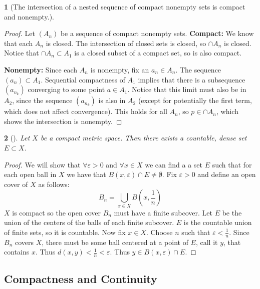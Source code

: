\documentclass[11pt]{article}
\numberwithin{equation}{section}
\theoremstyle{plain}
\newtheorem{theorem}{\color{ForestGreen}{\textbf{Theorem}}}[section]
\theoremstyle{definition}
\def\ss{\subset}
\newcommand{\1}{\mathbbm 1}
\newcommand{\e}{\varepsilon}
\begin{document}
\begin{theorem}[The intersection of a nested sequence of compact nonempty sets is compact and nonempty.]
\end{theorem}
\begin{proof}
	Let $(A_n)$ be a sequence of compact nonempty sets. 
	\textbf{Compact:} We know that each $A_n$ is closed. The intersection of closed sets is closed, so $\cap A_n$ is closed. Notice that $\cap A_n \ss A_1$ is a closed subset of a compact set, so is also compact. 

	\textbf{Nonempty:} Since each $A_n$ is nonempty, fix an $a_n \in A_n$. The sequence $(a_n) \ss A_1$. Sequential compactness of $A_1$ implies that there is a subsequence $(a_{n_k})$ converging to some point $a \in A_1$. Notice that this limit must also be in $A_2$, since the sequence $(a_{n_k})$ is also in $A_2$ (except for potentially the first term, which does not affect convergence). This holds for all $A_n$, so $p \in \cap A_n$, which shows the intersection is nonempty.   
\end{proof}


\begin{theorem}[]
	Let $X$ be a compact metric space. Then there exists a countable, dense set $E \subset X$. 
\end{theorem}
\begin{proof}
	We will show that $\forall \e >0$ and $\forall x \in X$ we can find a a set $E$ such that for each open ball in $X$ we have that $B(x,\e) \cap E \neq \emptyset$. Fix $\e > 0$ and define an open cover of $X$ as follows:
	\begin{equation}
		B_n = \bigcup_{x \in X} B(x,\frac{1}{n})
	\end{equation}
	$X$ is compact so the open cover $B_n$ must have a finite subcover. Let $E$ be the union of the centers of the balls of each finite subcover. $E$ is the countable union of finite sets, so it is countable. Now fix $x \in X$. Choose $n$ such that $\e < \frac{1}{n}$. Since $B_n$ covers $X$, there must be some ball centered at a point of $E$, call it $y$, that contains $x$. Thus $d(x,y) < \frac{1}{n} < \e$. Thus $y \in B(x,\e) \cap E$. 
\end{proof}


\subsection{Compactness and Continuity}
\end{document}
